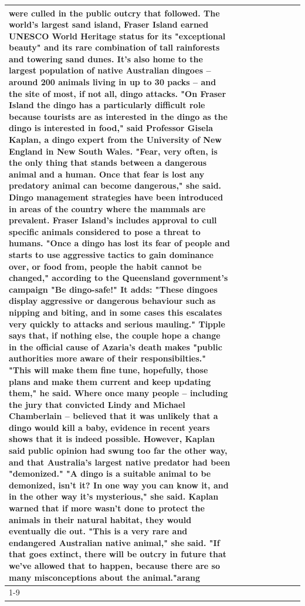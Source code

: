 \begin{table}[H]
\begin{tabular}{lllrlllll}
were culled in the public outcry that followed. The world's largest sand island, Fraser Island earned UNESCO World Heritage status for its "exceptional beauty" and its rare combination of tall rainforests and towering sand dunes. It's also home to the largest population of native Australian dingoes -- around 200 animals living in up to 30 packs -- and the site of most, if not all, dingo attacks. "On Fraser Island the dingo has a particularly difficult role because tourists are as interested in the dingo as the dingo is interested in food," said Professor Gisela Kaplan, a dingo expert from the University of New England in New South Wales. "Fear, very often, is the only thing that stands between a dangerous animal and a human. Once that fear is lost any predatory animal can become dangerous," she said. Dingo management strategies have been introduced in areas of the country where the mammals are prevalent. Fraser Island's includes approval to cull specific animals considered to pose a threat to humans. "Once a dingo has lost its fear of people and starts to use aggressive tactics to gain dominance over, or food from, people the habit cannot be changed," according to the Queensland government's campaign "Be dingo-safe!" It adds: "These dingoes display aggressive or dangerous behaviour such as nipping and biting, and in some cases this escalates very quickly to attacks and serious mauling." Tipple says that, if nothing else, the couple hope a change in the official cause of Azaria's death makes "public authorities more aware of their responsibilties." "This will make them fine tune, hopefully, those plans and make them current and keep updating them," he said. Where once many people -- including the jury that convicted Lindy and Michael Chamberlain -- believed that it was unlikely that a dingo would kill a baby, evidence in recent years shows that it is indeed possible. However, Kaplan said public opinion had swung too far the other way, and that Australia's largest native predator had been "demonized." "A dingo is a suitable animal to be demonized, isn't it? In one way you can know it, and in the other way it's mysterious," she said. Kaplan warned that if more wasn't done to protect the animals in their natural habitat, they would eventually die out. "This is a very rare and endangered Australian native animal," she said. "If that goes extinct, there will be outcry in future that we've allowed that to happen, because there are so many misconceptions about the animal."arang \\
\cline{1-9}

\end{tabular}
\end{table}
